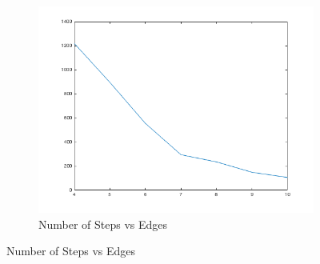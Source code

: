 \documentclass{article}
\begin{document}
\begin{figure}[h!]
\begin{subfigure}[t]{0.3\textwidth}
\includegraphics[width=\textwidth]{pi-ov2-conv.png}
\caption{Number of Steps vs Edges}
\end{subfigure}
\end{figure}
\end{document}
